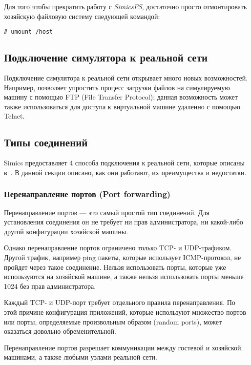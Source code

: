 Для того чтобы прекратить работу с \textit{SimicsFS}, достаточно просто отмонтировать хозяйскую файловую систему следующей командой:

\begin{lstlisting}
# umount /host
\end{lstlisting}

\subsection{Подключение симулятора к реальной сети}

Подключение симулятора к реальной сети открывает много новых возможностей. Например, позволяет упростить процесс загрузки файлов на симулируемую машину с помощью FTP (\abbr File Transfer Protocol); данная возможность может также использоваться для доступа к виртуальной машине удаленно с помощью Telnet.

\subsection{Типы соединений}

Simics предоставляет 4 способа подключения к реальной сети, которые описаны в~\cite{enug}. В данной секции описано, как они работают, их преимущества и недостатки.

\subsubsection{Перенаправление портов (\abbr Port forwarding)}

Перенаправление портов --- это самый простой тип соединений. Для установления соединения он не требует ни прав администратора, ни какой-либо другой конфигурации хозяйской машины.

Однако перенаправление портов ограничено только TCP- и UDP-трафиком. Другой трафик, например ping пакеты, которые использует ICMP-протокол, не пройдет через такое соединение. Нельзя использовать порты, которые уже используются на хозяйской машине, а также нельзя использовать порты меньше 1024 без прав администратора.

Каждый TCP- и UDP-порт требует отдельного правила перенаправления. По этой причине конфигурация приложений, которые используют множество портов или порты, определяемые произвольным образом (\abbr random ports), может оказаться довольно обременительной.

Перенаправление портов разрешает коммуникации между гостевой и хозяйской машинами, а также любыми узлами реальной сети.

